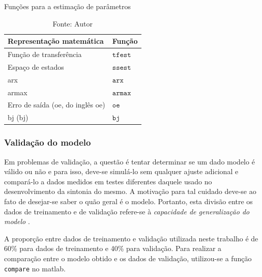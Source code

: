 \begin{table}[h]
	\centering
	\caption{Funções para a estimação de parâmetros}
	\label{tab:param_est_functions}
	\begin{tabular}{ll} \toprule
		{Representação matemática}		                                & {Função}				                    \\ \midrule
		Função de transferência		                                    & $\mathtt{tfest}$                          \\
		Espaço de estados   		                                    & $\mathtt{ssest}$                          \\
		\acrshort{arx}		                                            & $\mathtt{arx}$                            \\
		\acrshort{armax}		                                        & $\mathtt{armax}$                          \\
		Erro de saída (\acrshort{oe}, do inglês \acrlong{oe})		    & $\mathtt{oe}$                             \\
		\acrlong{bj} (\acrshort{bj})             	                    & $\mathtt{bj}$                             \\ \bottomrule
	\end{tabular}
	\caption*{Fonte: Autor}
\end{table}

\subsubsection{Validação do modelo}
\label{subsubsec:validacao_do_modelo}

Em problemas de validação, a questão é tentar determinar se um dado modelo é válido ou não e para isso,
deve-se simulá-lo sem qualquer ajuste adicional e compará-lo a dados medidos em testes diferentes daquele
usado no desenvolvimento da sintonia do mesmo. A motivação para tal cuidado deve-se ao fato de desejar-se
saber o quão geral é o modelo. Portanto, esta divisão entre os dados de treinamento e de validação refere-se
à \textit{capacidade de generalização do modelo} \cite{Aguirre2015}.

A proporção entre dados de treinamento e validação utilizada neste trabalho é de 60\% para dados de treinamento
e 40\% para validação. Para realizar a comparação entre o modelo obtido e os dados de validação, utilizou-se
a função \texttt{compare} no \acrshort{matlab}.

